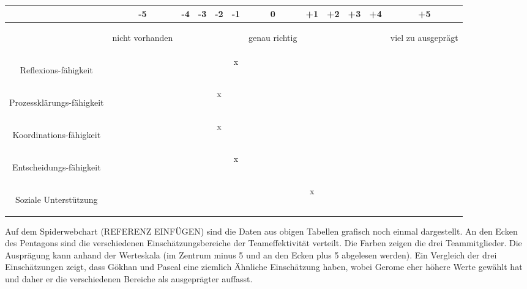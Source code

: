 \begin{tabular}{C{\fabstand}|C{\abstand}|C{\abstand}|C{\abstand}|C{\abstand}|C{\abstand}|C{\abstand}|C{\abstand}|C{\abstand}|C{\abstand}|C{\abstand}|C{\abstand}|}
\hline
& -5 & -4 & -3 & -2 & -1 & 0 & +1 & +2 & +3 & +4 & +5\\
\hline
&\begin{tiny}nicht vorhanden \end{tiny}& & & & & \begin{tiny}genau richtig \end{tiny}& & & & & \begin{tiny}viel zu ausgeprägt\end{tiny}\\
\hline
\begin{tiny} Reflexions-fähigkeit \end{tiny} & & & & & x & & & & & & \\
\hline
\begin{tiny} Prozessklärungs-fähigkeit \end{tiny}& & & & x & & & & & & & \\
\hline
\begin{tiny} Koordinations-fähigkeit \end{tiny}& & & & x & & & & & & & \\
\hline
\begin{tiny} Entscheidungs-fähigkeit \end{tiny}& & & & & x & & & & & & \\
\hline
\begin{tiny} Soziale Unterstützung \end{tiny}& & & & & & & x & & & & \\
\hline
\end{tabular}

Auf dem Spiderwebchart (REFERENZ EINFÜGEN) sind die Daten aus obigen Tabellen grafisch noch einmal dargestellt. An den Ecken des Pentagons sind die verschiedenen Einschätzungsbereiche der Teameffektivität verteilt. Die Farben zeigen die drei Teammitglieder. Die Ausprägung kann anhand der Werteskala (im Zentrum minus 5 und an den Ecken plus 5 abgelesen werden).
Ein Vergleich der drei Einschätzungen zeigt, dass Gökhan und Pascal eine ziemlich Ähnliche Einschätzung haben, wobei Gerome eher höhere Werte gewählt hat und daher er die verschiedenen Bereiche als ausgeprägter auffasst.

